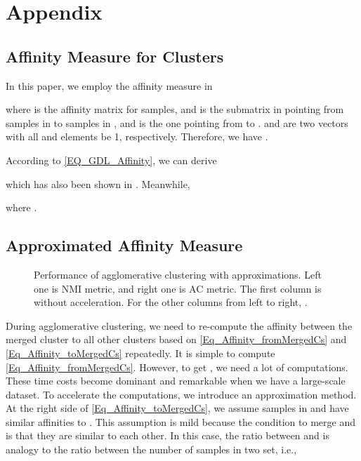 \documentclass[10pt,twocolumn,letterpaper]{article}
\begin{document}

{\small

}
\appendix
\section{Appendix}

\subsection{Affinity Measure for Clusters}
\label{Ap_Affinity_Measure_Cluster}
In this paper, we employ the affinity measure in \cite{zhang2012graph}

where  is the affinity matrix for samples, and  is the submatrix in  pointing from samples in  to samples in , and  is the one pointing from  to .  and  are two vectors with all  and  elements be 1, respectively. Therefore, we have .

According to \eqref{EQ_GDL_Affinity}, we can derive 

which has also been shown in \cite{zhang2012graph}. Meanwhile,

where .

\subsection{Approximated Affinity Measure}
\label{Ap_Affinity_Measure}
\begin{figure*}[t]
   \begin{minipage}{0.5\linewidth}
   \centering
   \end{minipage}
   \begin{minipage}{0.5\linewidth}
   \centering
   \end{minipage}        
   \caption{Performance of agglomerative clustering with approximations. Left one is NMI metric, and right one is AC metric. The first column is without acceleration. For the other columns from left to right, .}
   \label{Fig_Approximation_EvalPerf}
\end{figure*}
During agglomerative clustering, we need to re-compute the affinity between the merged cluster to all other clusters based on \ref{Eq_Affinity_fromMergedCs} and \ref{Eq_Affinity_toMergedCs} repeatedly. It is simple to compute \ref{Eq_Affinity_fromMergedCs}. However, to get , we need a lot of computations. These time costs become dominant and remarkable when we have a large-scale dataset. To accelerate the computations, we introduce an approximation method. At the right side of \eqref{Eq_Affinity_toMergedCs}, we assume samples in  and  have similar affinities to . This assumption is mild because the condition to merge  and  is that they are similar to each other. In this case, the ratio between  and  is analogy to the  ratio between the number of samples in two set, i.e.,
\end{document}
